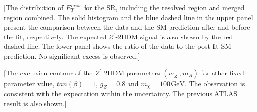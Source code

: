 \documentclass[class=NTHU_thesis, crop=false]{standalone}
\begin{document}
[The distribution of $E^{miss}_T$ for the SR, including the resolved region and merged region combined. The solid histogram and the blue dashed line in the upper panel present the comparison between the data and the SM prediction after and before the fit, respectively. The expected $Z^\prime$-2HDM signal is also shown by the red dashed line. The lower panel shows the ratio of the data to the post-fit SM prediction. No significant excess is observed.]

[The exclusion contour of the $Z^\prime$-2HDM parameters $(m_{Z^\prime}, m_A)$ for other fixed parameter value, $tan(\beta) = 1$, $g_Z = 0.8$ and $m_\chi = 100\, \mathrm{GeV}$. The observation is consistent with the expectation within the uncertainty. The previous ATLAS result is also shown.]
\end{document}
